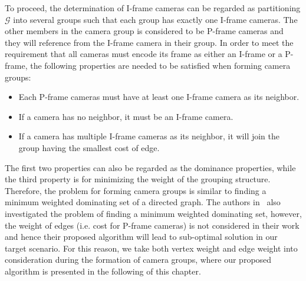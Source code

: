 To proceed, the determination of I-frame cameras can be regarded as partitioning $\mathcal{G}$ into several groups such that each group has exactly one I-frame cameras.
The other members in the camera group is considered to be P-frame cameras and they will reference from the I-frame camera in their group.
In order to meet the requirement that all cameras must encode its frame as either an I-frame or a P-frame, the following properties are needed to be satisfied when forming camera groups:
\begin{itemize}
\item Each P-frame cameras must have at least one I-frame camera as its neighbor.
\item If a camera has no neighbor, it must be an I-frame camera.
\item If a camera has multiple I-frame cameras as its neighbor, it will join the group having the smallest cost of edge.
\end{itemize}
The first two properties can also be regarded as the dominance properties, while the third property is for minimizing the weight of the grouping structure.
Therefore, the problem for forming camera groups is similar to finding a minimum weighted dominating set of a directed graph.
The authors in~\cite{MWDS_baseline} also investigated the problem of finding a minimum weighted dominating set, however, the weight of edges (i.e. cost for P-frame cameras) is not considered in their work and hence their proposed algorithm will lead to sub-optimal solution in our target scenario.
For this reason, we take both vertex weight and edge weight into consideration during the formation of camera groups, where our proposed algorithm is presented in the following of this chapter.
%
